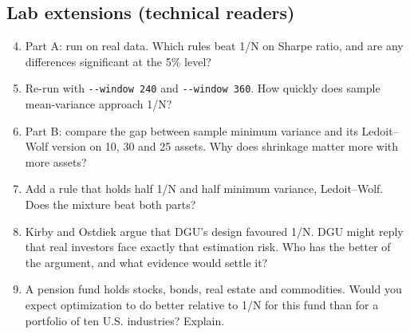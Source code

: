 \subsection*{Lab extensions (technical readers)}

\begin{enumerate}
  \setcounter{enumi}{3}
  \item Part A: run on real data. Which rules beat 1/N on Sharpe ratio, and are any differences significant at the 5\% level?
  \item Re-run with \texttt{-{}-window 240} and \texttt{-{}-window 360}. How quickly does sample mean-variance approach 1/N?
  \item Part B: compare the gap between sample minimum variance and its Ledoit--Wolf version on 10, 30 and 25 assets. Why does shrinkage matter more with more assets?
  \item Add a rule that holds half 1/N and half minimum variance, Ledoit--Wolf. Does the mixture beat both parts?
  \item Kirby and Ostdiek argue that DGU's design favoured 1/N. DGU might reply that real investors face exactly that estimation risk. Who has the better of the argument, and what evidence would settle it?
  \item A pension fund holds stocks, bonds, real estate and commodities. Would you expect optimization to do better relative to 1/N for this fund than for a portfolio of ten U.S. industries? Explain.
\end{enumerate}